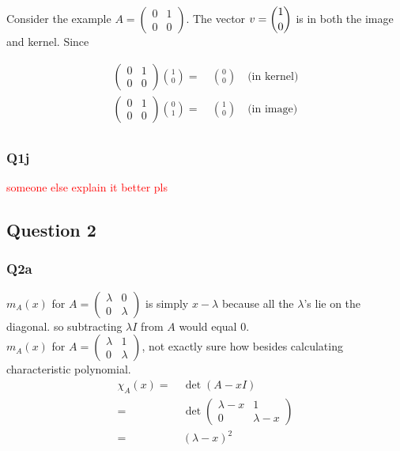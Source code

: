 Consider the example $A=\begin{pmatrix}
		0 & 1 \\
		0 & 0
	\end{pmatrix}$. The vector $v=\dbinom{1}{0}$ is in both the image and kernel. Since

\begin{align*}
	\begin{pmatrix}
		0 & 1 \\
		0 & 0
	\end{pmatrix}\binom{1}{0}= & \ \binom{0}{0} \quad\text{(in kernel)} \\
	\begin{pmatrix}
		0 & 1 \\
		0 & 0
	\end{pmatrix}\binom{0}{1}= & \ \binom{1}{0}\quad\text{(in image)}   \\
\end{align*}

\subsubsection{Q1j}
\textcolor{red}{someone else explain it better pls}


\subsection{Question 2}
\subsubsection{Q2a}
$m_A(x)$ for $A=\begin{pmatrix}
		\lambda&0\\ 0& \lambda\end{pmatrix}$ is simply $x-\lambda$ because all the $\lambda$'s lie on the diagonal. so subtracting $\lambda I$ from $A$ would equal 0.\\
$m_A(x)$ for $A=\begin{pmatrix}
		\lambda&1\\ 0& \lambda\end{pmatrix}$, not exactly sure how besides calculating characteristic polynomial.
\begin{align*}
	\chi_A(x)= & \ \det(A-xI)                                   \\
	=          & \ \det \begin{pmatrix}
		                    \lambda-x&1\\ 0& \lambda-x\end{pmatrix} \\
	=          & \ (\lambda-x)^2
\end{align*}


